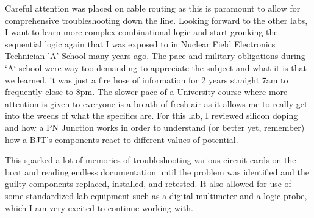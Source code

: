 \documentclass[12pt]{report}
\begin{document}
Careful attention was placed on cable routing as this is paramount to allow for comprehensive troubleshooting down the line. Looking forward to the other labs, I want to learn more complex combinational logic and start gronking the sequential logic again that I was exposed to in Nuclear Field Electronics Technician 'A' School many years ago. The pace and military obligations during `A` school were way too demanding to appreciate the subject and what it is that we learned, it was just a fire hose of information for 2 years straight 7am to frequently close to 8pm. The slower pace of a University course where more attention is given to everyone is a breath of fresh air as it allows me to really get into the weeds of what the specifics are. For this lab, I reviewed silicon doping and how a PN Junction works in order to understand (or better yet, remember) how a BJT's components react to different values of potential.

This sparked a lot of memories of troubleshooting various circuit cards on the boat and reading endless documentation until the problem was identified and the guilty components replaced, installed, and retested. It also allowed for use of some standardized lab equipment such as a digital multimeter and a logic probe, which I am very excited to continue working with.
\end{document}
